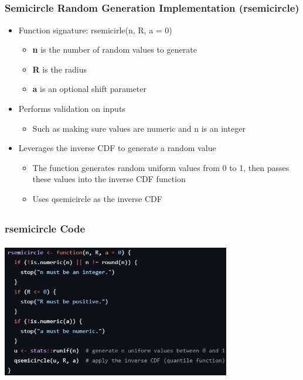 \documentclass[handout, xcolor=dvipsnames]{beamer}
\begin{document}
\subsection{}
\begin{frame}
	\frametitle{Semicircle Random Generation Implementation (rsemicircle)}
        \begin{itemize}
            \item Function signature: rsemicirle(n, R, a = 0)
            \begin{itemize}
                \item \textbf{n} is the number of random values to generate
                \item \textbf{R} is the radius
                \item \textbf{a} is an optional shift parameter
            \end{itemize}
            \item Performs validation on inputs
            \begin{itemize}
                \item Such as making sure values are numeric and n is an integer
            \end{itemize}
            \item Leverages the inverse CDF to generate a random value
            \begin{itemize}
                \item The function generates random uniform values from 0 to 1, then passes these values into the inverse CDF function
                \item Uses qsemicircle as the inverse CDF
            \end{itemize}
        \end{itemize}
\end{frame}


\subsection{}
\begin{frame}
	\frametitle{rsemicircle Code}
        \begin{center}
            \includegraphics[width=10cm,height=6cm]{Figures/rsemi_code.png}
        \end{center}
\end{frame}
\end{document}
